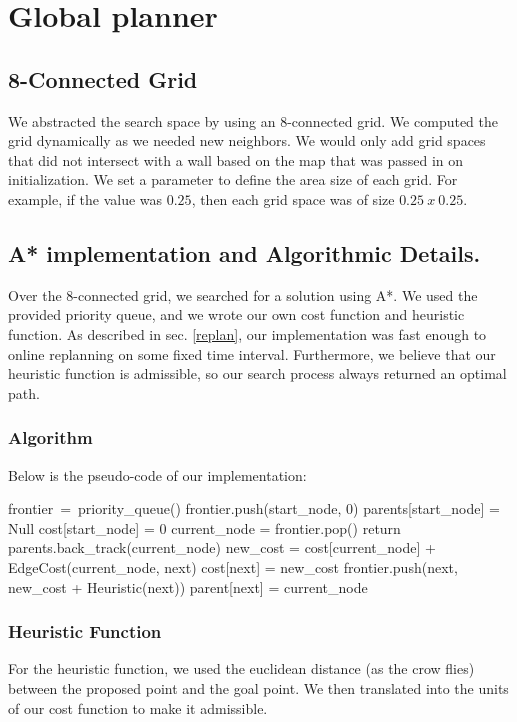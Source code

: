 \section{Global planner}

\subsection{8-Connected Grid}
We abstracted the search space by using an 8-connected grid. We computed the grid dynamically as we needed new neighbors. We would only add grid spaces that did not intersect with a wall based on the map that was passed in on initialization. We set a parameter to define the area size of each grid. For example, if the value was $0.25$, then each grid space was of size $0.25~x~0.25$. 

\subsection{A* implementation and Algorithmic Details.}
Over the 8-connected grid, we searched for a solution using A*. We used the provided priority queue, and we wrote our own cost function and heuristic function. As described in sec. \ref{replan}, our implementation was fast enough to online replanning on some fixed time interval. Furthermore, we believe that our heuristic function is admissible, so our search process always returned an optimal path. 

\subsubsection{Algorithm}
Below is the pseudo-code of our implementation: 
\begin{algorithmic}[1]
\State frontier$~=~$priority\_queue()
\State frontier.push(start\_node, 0)
\State parents[start\_node] = Null
\State cost[start\_node] = 0
	\State current\_node = frontier.pop()
		\State return parents.back\_track(current\_node)
	\EndIf
		\State new\_cost = cost[current\_node] + EdgeCost(current\_node, next)
			\State cost[next] = new\_cost
			\State frontier.push(next, new\_cost + Heuristic(next))
			\State parent[next] = current\_node
		\EndIf
	\EndFor
\EndWhile
\end{algorithmic}

\subsubsection{Heuristic Function}
For the heuristic function, we used the euclidean distance (as the crow flies) between the proposed point and the goal point. We then translated into the units of our cost function to make it admissible. 

